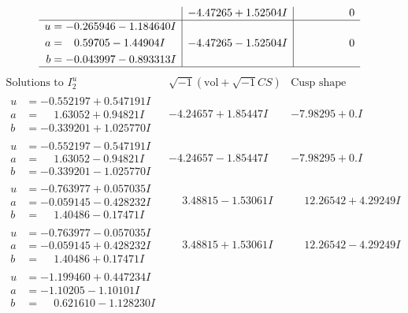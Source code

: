 \documentclass[1p]{elsarticle_modified}
\theoremstyle{definition}
\newcommand{\I}{\sqrt{-1}}
\begin{document}
$$\begin{array}{c|c|c}
 & -4.47265 + 1.52504 I & \phantom{-0.000000 } 0 \\ \hline\begin{aligned}
u &= -0.265946 - 1.184640 I \\
a &= \phantom{-}0.59705 - 1.44904 I \\
b &= -0.043997 - 0.893313 I\end{aligned}
 & -4.47265 - 1.52504 I & \phantom{-0.000000 } 0\\
 \hline 
 \end{array}$$\newpage$$\begin{array}{c|c|c}  
\text{Solutions to }I^u_{2}& \I (\text{vol} + \sqrt{-1}CS) & \text{Cusp shape}\\
 \hline 
\begin{aligned}
u &= -0.552197 + 0.547191 I \\
a &= \phantom{-}1.63052 + 0.94821 I \\
b &= -0.339201 + 1.025770 I\end{aligned}
 & -4.24657 + 1.85447 I & -7.98295 + 0. I\phantom{ +0.000000I} \\ \hline\begin{aligned}
u &= -0.552197 - 0.547191 I \\
a &= \phantom{-}1.63052 - 0.94821 I \\
b &= -0.339201 - 1.025770 I\end{aligned}
 & -4.24657 - 1.85447 I & -7.98295 + 0. I\phantom{ +0.000000I} \\ \hline\begin{aligned}
u &= -0.763977 + 0.057035 I \\
a &= -0.059145 - 0.428232 I \\
b &= \phantom{-}1.40486 - 0.17471 I\end{aligned}
 & \phantom{-}3.48815 - 1.53061 I & \phantom{-}12.26542 + 4.29249 I \\ \hline\begin{aligned}
u &= -0.763977 - 0.057035 I \\
a &= -0.059145 + 0.428232 I \\
b &= \phantom{-}1.40486 + 0.17471 I\end{aligned}
 & \phantom{-}3.48815 + 1.53061 I & \phantom{-}12.26542 - 4.29249 I \\ \hline\begin{aligned}
u &= -1.199460 + 0.447234 I \\
a &= -1.10205 - 1.10101 I \\
b &= \phantom{-}0.621610 - 1.128230 I\end{aligned}

\end{array}$$
\end{document}
